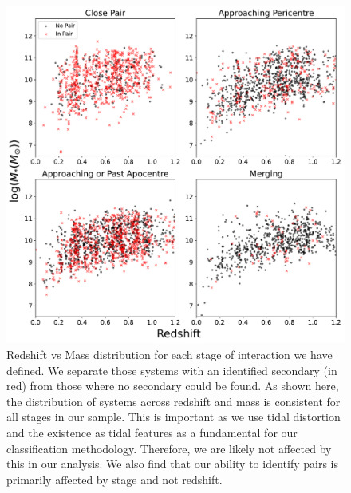 \begin{figure}
    \centering
    \includegraphics[width=\textwidth]{Chapter3/figures/redshift-limitations.pdf}
    \caption[Redshift vs Mass distribution for each stage of interaction we have defined.]{Redshift vs Mass distribution for each stage of interaction we have defined. We separate those systems with an identified secondary (in red) from those where no secondary could be found. As shown here, the distribution of systems across redshift and mass is consistent for all stages in our sample. This is important as we use tidal distortion and the existence as tidal features as a fundamental for our classification methodology. Therefore, we are likely not affected by this in our analysis. We also find that our ability to identify pairs is primarily affected by stage and not redshift.}
    \label{fig:redshift_selection}
\end{figure}

